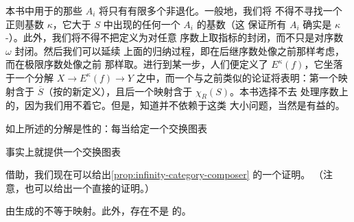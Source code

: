 \begin{remark}\label{rem:small-object-size}
本书中用于\trSmallObjectArgument{}的那些\trSimplicialSet{} $A_i$ 将只有有限多个非退化\trSimplex{}。一般地，我们将
不得不寻找一个正则基数 $\kappa$，它大于 $S$ 中出现的任何一个 $A_i$ 的基数（这
保证所有 $A_i$ 确实是 $\kappa$-\trCompact{}）。此外，我们将不得不把\trSaturatedSet{}定义为对任意
序数上取指标的\trColimit{}封闭，而不只是对序数 $\omega$ 封闭。然后我们可以延续
上面的归纳过程，即在后继序数处像之前那样考虑\trPushout{}，而在极限序数处像之前
那样取\trColimit{}。进行到某一步，人们便定义了 $E^{\kappa}(f)$，它坐落于一个分解
$X \to E^{\kappa}(f) \to Y$ 之中，而一个与之前类似的论证将表明：第一个映射含于
$\overline{S}$（按\trSaturatedSet{}的新定义），且后一个映射含于 $\chi_R(S)$。本书选择不去
处理序数上的\trColimit{}，因为我们用不着它。但是，知道\trSmallObjectArgument{}并不依赖于这类
大小问题，当然是有益的。
\end{remark}

\begin{remark}\label{rem:small-object-functorial}
如上所述的分解是\trFunctor{}性的：每当给定一个交换图表
\begin{center}
\end{center}
\trSmallObjectArgument{}事实上就提供一个交换图表
\begin{center}
\end{center}
\end{remark}

借助\trSmallObjectArgument{}，我们现在可以给出\cref{prop:infinity-category-composer} 的一个证明。
（注意，也可以给出一个直接的证明。）

\begin{proposition}\label{prop:spine-closure-not-inner-anodyne}
由\trSpineInclusion{}生成的\trSaturatedSet{}不等于\trInnerAnodyne{}映射。此外，存在不是%
\trInfinityCategory{}的\trComposer{}。
\end{proposition}


